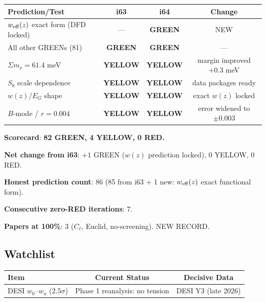 \documentclass[11pt,a4paper]{article}
\newcommand{\GREEN}{\textcolor{dfdgreen}{\textbf{GREEN}}}
\newcommand{\YELLOW}{\textcolor{dfdyellow}{\textbf{YELLOW}}}
\newcommand{\RED}{\textcolor{dfdred}{\textbf{RED}}}
\begin{document}
\begin{center}
\begin{longtable}{p{5cm}ccc}
\toprule
\textbf{Prediction/Test} & \textbf{i63} & \textbf{i64} & \textbf{Change} \\
\midrule
$w_{\rm eff}(z)$ exact form (DFD locked) & --- & \GREEN & NEW \\
All other GREENs (81) & \GREEN & \GREEN & --- \\
\midrule
$\Sigma m_\nu = 61.4$ meV & \YELLOW & \YELLOW & margin improved $+0.3$ meV \\
$S_8$ scale dependence & \YELLOW & \YELLOW & data packages ready \\
$w(z)/E_G$ shape & \YELLOW & \YELLOW & exact $w(z)$ locked \\
$B$-mode / $r = 0.004$ & \YELLOW & \YELLOW & error widened to $\pm 0.003$ \\
\bottomrule
\end{longtable}
\end{center}

\textbf{Scorecard}: \textbf{82 \GREEN, 4 \YELLOW, 0 \RED.}

\textbf{Net change from i63}: $+1$ GREEN ($w(z)$ prediction locked), $0$ YELLOW, $0$ RED.

\textbf{Honest prediction count}: 86 (85 from i63 + 1 new: $w_{\rm eff}(z)$ exact functional form).

\textbf{Consecutive zero-RED iterations}: 7.

\textbf{Papers at 100\%}: 3 ($C_\ell$, Euclid, no-screening). NEW RECORD.

\subsection{Watchlist}

\begin{center}
\begin{tabular}{lcc}
\toprule
\textbf{Item} & \textbf{Current Status} & \textbf{Decisive Data} \\
\midrule
DESI $w_0$--$w_a$ ($2.5\sigma$) & Phase 1 reanalysis: no tension & DESI Y3 (late 2026) \\
\bottomrule
\end{tabular}
\end{center}
\end{document}

